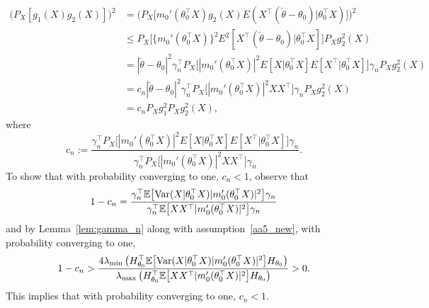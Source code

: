 \begin{align*}
\big(P_X[g_1(X) g_2(X)]\big)^2
&= \big(P_X \big[ m_0'(\theta_0^{\top}X)g_2(X)E(X^{\top}(\check{\theta} - \theta_0)|\theta_0^{\top}X)\big]\big)^2\\
&\le P_X\big[\{m_0'(\theta_0^{\top}X)\}^2E^2[X^{\top}(\check{\theta} - \theta_0)|\theta_0^{\top}X]\big]P_Xg_2^2(X)\\
&= |\check{\theta} - \theta_0|^2 \gamma_n^\top P_X\big[|m_0'(\theta_0^{\top}X)|^2E[X|\theta_0^{\top}X] E[X^{\top}|\theta_0^{\top}X]\big] \gamma_n P_Xg_2^2(X)\\
&= c_n |\check{\theta} - \theta_0|^2 \gamma_n^\top P_X\big[|m_0'(\theta_0^{\top}X)|^2XX^{\top}\big] \gamma_n P_Xg_2^2(X)\\
&= c_n P_X g_1^2 P_Xg_2^2(X),
\end{align*}
where \[c_n:= \frac{ \gamma_n^\top P_X\big[|m_0'(\theta_0^{\top}X)|^2E[X|\theta_0^{\top}X] E[X^{\top}|\theta_0^{\top}X]\big] \gamma_n }{\gamma_n^\top P_X\big[|m_0'(\theta_0^{\top}X)|^2 X X^{\top}\big] \gamma_n}.
\]
To show that with probability converging to one, $c_n < 1$, observe that
\[
1 - c_n = \frac{ \gamma_n^\top\mathbb{E}\big[\mathrm{Var}(X|\theta_0^\top X) |m_0'(\theta_0^{\top}X)|^2\big]\gamma_n}{ \gamma_n^\top\mathbb{E}\big[XX^{\top} |m_0'(\theta_0^{\top}X)|^2\big]\gamma_n}
\]
and by Lemma~\ref{lem:gamma_n} along with assumption~\ref{aa5_new}, with probability converging to one,
\[
1 - c_n > \frac{ 4\lambda_{\min}\left(H_{\theta_0}^{\top}\mathbb{E}\big[\mathrm{Var}(X|\theta_0^\top X) |m_0'(\theta_0^{\top}X)|^2\big]H_{\theta_0}\right)}{\lambda_{\max}\left(H_{\theta_0}^{\top}\mathbb{E}\big[XX^{\top} |m_0'(\theta_0^{\top}X)|^2\big]H_{\theta_0}\right)} > 0.
\]
This implies that with probability converging to one, $c_n < 1.$
